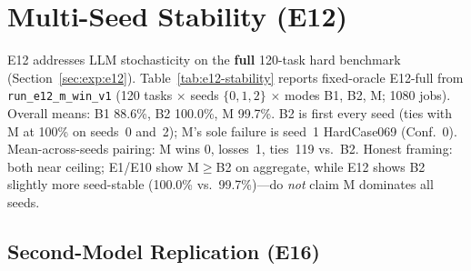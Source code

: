 \section{Multi-Seed Stability (E12)}
\label{sec:results:e12}

E12 addresses LLM stochasticity on the \textbf{full} 120-task hard benchmark
(Section~\ref{sec:exp:e12}).
Table~\ref{tab:e12-stability} reports fixed-oracle E12-full from
\texttt{run\_e12\_m\_win\_v1} (120 tasks $\times$ seeds $\{0,1,2\}$ $\times$
modes B1, B2, M; 1080 jobs).
Overall means: B1 88.6\%, B2 100.0\%, M 99.7\%.
B2 is first every seed (ties with M at 100\% on seeds~0 and~2); M's sole
failure is seed~1 HardCase069 (Conf.\ 0).
Mean-across-seeds pairing: M wins 0, losses~1, ties~119 vs.\ B2.
Honest framing: both near ceiling; E1/E10 show M$\ge$B2 on aggregate, while
E12 shows B2 slightly more seed-stable (100.0\% vs.\ 99.7\%)---do \emph{not}
claim M dominates all seeds.

\begin{table}[H]
  \caption{E12-full multi-seed stability under fixed others-witness oracle
    (\texttt{run\_e12\_m\_win\_v1}; 120 tasks, seeds $\{0,1,2\}$).
    Per-seed mean formal conformance (\%).}
  \label{tab:e12-stability}
  \centering
\end{table}

\subsection{Second-Model Replication (E16)}
\label{sec:results:e16}

